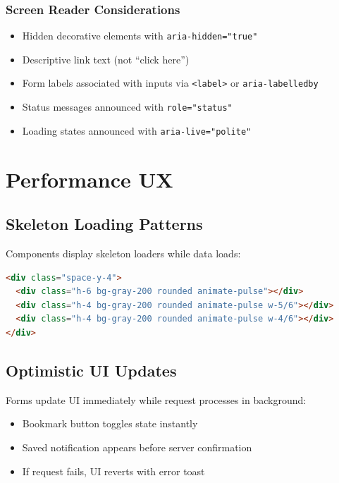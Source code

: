 \documentclass{report}
\begin{document}
\subsection{Screen Reader Considerations}

\begin{itemize}
    \item Hidden decorative elements with \texttt{aria-hidden="true"}
    \item Descriptive link text (not ``click here'')
    \item Form labels associated with inputs via \texttt{<label>} or \texttt{aria-labelledby}
    \item Status messages announced with \texttt{role="status"}
    \item Loading states announced with \texttt{aria-live="polite"}
\end{itemize}

\chapter{Performance UX}

\section{Skeleton Loading Patterns}

Components display skeleton loaders while data loads:

\begin{lstlisting}[language=HTML]
<div class="space-y-4">
  <div class="h-6 bg-gray-200 rounded animate-pulse"></div>
  <div class="h-4 bg-gray-200 rounded animate-pulse w-5/6"></div>
  <div class="h-4 bg-gray-200 rounded animate-pulse w-4/6"></div>
</div>
\end{lstlisting}

\section{Optimistic UI Updates}

Forms update UI immediately while request processes in background:

\begin{itemize}
    \item Bookmark button toggles state instantly
    \item Saved notification appears before server confirmation
    \item If request fails, UI reverts with error toast
\end{itemize}
\end{document}
